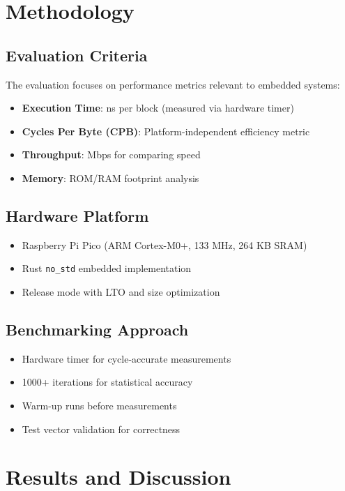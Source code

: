 \documentclass[12pt]{report}
\begin{document}
\chapter{Methodology}

\section{Evaluation Criteria}

The evaluation focuses on performance metrics relevant to embedded systems:

\begin{itemize}
    \item \textbf{Execution Time}: ns per block (measured via hardware timer)
    \item \textbf{Cycles Per Byte (CPB)}: Platform-independent efficiency metric
    \item \textbf{Throughput}: Mbps for comparing speed
    \item \textbf{Memory}: ROM/RAM footprint analysis
\end{itemize}

\section{Hardware Platform}

\begin{itemize}
    \item Raspberry Pi Pico (ARM Cortex-M0+, 133 MHz, 264 KB SRAM)
    \item Rust \texttt{no\_std} embedded implementation
    \item Release mode with LTO and size optimization
\end{itemize}

\section{Benchmarking Approach}

\begin{itemize}
    \item Hardware timer for cycle-accurate measurements
    \item 1000+ iterations for statistical accuracy
    \item Warm-up runs before measurements
    \item Test vector validation for correctness
\end{itemize}

\chapter{Results and Discussion}
\end{document}
